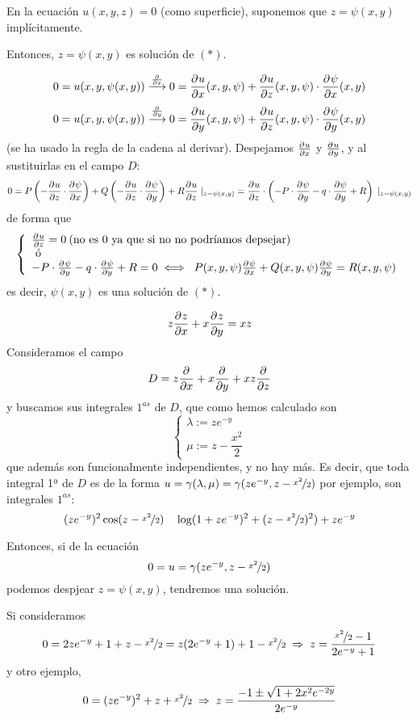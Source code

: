     En la ecuación $u(x,y,z)=0$ (como superficie), suponemos que $z=\psi(x,y)$ implícitamente. 
    \begin{prop}
        Entonces, $z=\psi(x,y)$ es solución de $(*)$.
    \end{prop}
    \begin{dem}
        $$0=u(x,y,\psi(x,y)) \overset{\frac{\partial^{} }{\partial x}}{\longrightarrow} 0=\frac{\partial^{} u}{\partial x}(x,y,\psi) + \frac{\partial^{} u}{\partial z} (x,y,\psi) \cdot \frac{\partial^{} \psi}{\partial x}(x,y)$$
        $$0=u(x,y,\psi(x,y)) \overset{\frac{\partial^{} }{\partial y}}{\longrightarrow} 0=\frac{\partial^{} u}{\partial y}(x,y,\psi) + \frac{\partial^{} u}{\partial z} (x,y,\psi) \cdot \frac{\partial^{} \psi}{\partial y}(x,y)$$
        (se ha usado la regla de la cadena al derivar). Despejamos $\frac{\partial^{} u}{\partial x}$ y $\frac{\partial^{} u}{\partial y}$, y al sustituirlas en el campo $D$:
        $$0=P\left(-\pd{u}{z} \cdot \pd{\psi}{x} \right) + Q\left(-\pd{u}{z} \cdot \pd{\psi}{y} \right) + R \pd{u}{z} \; \Huge|_{z=\psi(x,y)}=\pd{u}{z}\cdot\left(-P \cdot \pd{\psi}{y} -q \cdot \pd{\psi}{y} + R  \right) \; \Huge|_{z=\psi(x,y)} $$
        de forma que 
        $$\left\{ \begin{array}{l}
             \frac{\partial^{} u}{\partial z}=0 \: (\text{no es 0 ya que si no no podríamos depsejar})  \\
             \text{ ó } \\
             -P \cdot \frac{\partial^{} \psi}{\partial y} -q \cdot \frac{\partial^{} \psi}{\partial y} + R =0 \iff \; P(x,y,\psi) \frac{\partial^{} \psi}{\partial x}+Q(x,y,\psi) \frac{\partial^{} \psi}{\partial y}=R(x,y,\psi)
        \end{array} \right.$$
            es decir, $\psi(x,y)$ es una solución de $(*)$.
    \end{dem}
    \begin{eje}
        $$z\frac{\partial^{} z}{\partial x}+x\frac{\partial^{} z}{\partial y}=xz$$
        Consideramos el campo
        $$D=z \frac{\partial^{} }{\partial x} + x \frac{\partial^{} }{\partial y} + xz \frac{\partial^{} }{\partial z}$$
        y buscamos sus integrales $1^{as}$ de $D$, que como hemos calculado son
        $$\left\{ \begin{array}{l}
             \lambda:=z e^{-y}  \\
             \mu:= z- \dfrac{x^2}{2} 
        \end{array} \right.$$
        que además son funcionalmente independientes, y no hay más. Es decir, que toda integral 1ª de $D$ es de la forma $u=\gamma(\lambda,\mu)=\gamma(z e^{-y}, z- \nicefrac{x^2}{2} )$
        por ejemplo, son integrales $1^{as}$:
        $$(ze^{-y})^2 \cos(z-\nicefrac{x^2}{2}) \quad \log(1+ze^{-y})^2+(z-\nicefrac{x^2}{2}) ^2) + ze^{-y} $$

        Entonces, si de la ecuación 
        $$0=u=\gamma(z e^{-y}, z- \nicefrac{x^2}{2})$$
        podemos despjear $z=\psi(x,y)$, tendremos una solución.

        Si consideramos 
        $$0=2ze^{-y} + 1 + z -\nicefrac{x^2}{2}=z(2e^{-y}+1)+1-\nicefrac{x^2}{2} \; \Rightarrow \; z=\dfrac{\nicefrac{x^2}{2}-1}{2e^{-y}+1}$$
        y otro ejemplo,
        $$0=(ze^{-y})^2 + z + \nicefrac{x^2}{2} \; \Rightarrow \; z=\dfrac{-1\pm \sqrt{1+2x^2e^{-2y}}}{2e^{-y}}$$
    \end{eje}
